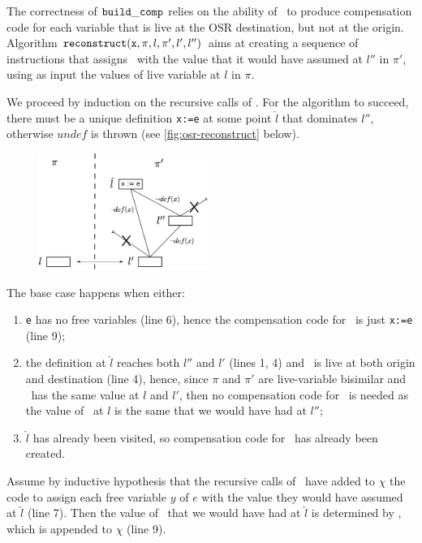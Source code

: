 \begin{myproof}
The correctness of ${\tt build\_comp}$ relies on the ability of \reconstruct\ to produce compensation code for each variable that is live at the OSR destination, but not at the origin. Algorithm $\text{${\tt reconstruct}$}(\text{${\tt x}$}, \pi, l, \pi', l', l'')$ aims at creating a sequence of instructions that assigns \wx\ with the value that it would have assumed at $l''$ in $\pi'$, using as input the values of live variable at $l$ in $\pi$.

We proceed by induction on the recursive calls of \reconstruct. For the algorithm to succeed, there must be a unique definition {\tt x:=e} at some point $\hat{l}$ that dominates $l''$, otherwise $undef$ is thrown (see \myfigure\ref{fig:osr-reconstruct} below). %

\ifdefined\noauthorea
\begin{figure}[!ht]
\begin{center}
\includegraphics[width=0.49\textwidth]{figures/osr-reconstruct/osr-reconstruct.eps}
\caption{\protect}
\end{center}
\end{figure}
\fi

\noindent The base case happens when either:
\begin{enumerate}[itemsep=3pt, parsep=0pt]
 \item {\tt e} has no free variables (line 6), hence the compensation code for \wx\ is just {\tt x:=e} (line 9);
 \item the definition at $\hat{l}$ reaches both $l''$ and $l'$ (lines 1, 4) and \wx\ is live at both origin and destination (line 4), hence, since $\pi$ and $\pi'$ are live-variable bisimilar and \wx\ has the same value at $l$ and $l'$, then no compensation code for \wx\ is needed as the value of \wx\ at $l$ is the same that we would have had at $l''$;
 \item $\hat{l}$ has already been visited, so compensation code for \wx\ has already been created.
\end{enumerate}

\noindent Assume by inductive hypothesis that the recursive calls of \reconstruct\ have added to $\chi$ the code to assign each free variable $y$ of $e$ with the value they would have assumed at $\hat{l}$ (line 7). Then the value of \wx\ that we would have had at $\hat{l}$ is determined by , which is appended to $\chi$ (line 9).
\end{myproof}

